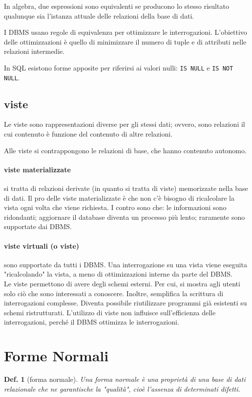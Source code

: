 \documentclass{article}
\newtheorem{definition}{Def.}[section]
\begin{document}
In algebra, due espressioni sono equivalenti se producono lo stesso risultato
qualunque sia l'istanza attuale delle relazioni della base di dati.

I DBMS usano regole di equivalenza per ottimizzare le interrogazioni.
L'obiettivo delle ottimizzazioni è quello di minimizzare il numero di tuple e di
attributi nelle relazioni intermedie.

In SQL esistono forme apposite per riferirsi ai valori nulli: \texttt{IS NULL}
e \texttt{IS NOT NULL}.

\subsection{viste}
Le viste sono rappresentazioni diverse per gli stessi dati; ovvero, sono
relazioni il cui contenuto è funzione del contenuto di altre relazioni.

Alle viste si contrappongono le relazioni di base, che hanno contenuto autonomo.

\paragraph{viste materializzate} si tratta di relazioni derivate (in quanto si
tratta di viste) memorizzate nella base di dati. Il pro delle viste
materializzate è che non c'è bisogno di ricalcolare la vista ogni volta che
viene richiesta. I contro sono che: le informazioni sono ridondanti; aggiornare
il database diventa un processo più lento; raramente sono supportate dai DBMS.

\paragraph{viste virtuali (o viste)} sono supportate da tutti i DBMS. Una
interrogazione su una vista viene eseguita "ricalcolando" la vista, a meno di
ottimizzazioni interne da parte del DBMS.\\

Le viste permettono di avere degli schemi esterni. Per cui, si mostra agli
utenti solo ciò che sono interessati a conoscere. Inoltre, semplifica la
scrittura di interrogazioni complesse. Diventa possibile riutilizzare programmi
già esistenti su schemi ristrutturati. L'utilizzo di viste non influisce
sull'efficienza delle interrogazioni, perché il DBMS ottimizza le
interrogazioni.

\section{Forme Normali}
\begin{definition}[forma normale]
	Una forma normale è una proprietà di una base di dati relazionale che ne
	garantische la "qualità", cioè l'assenza di determinati difetti.
\end{definition}
\end{document}
